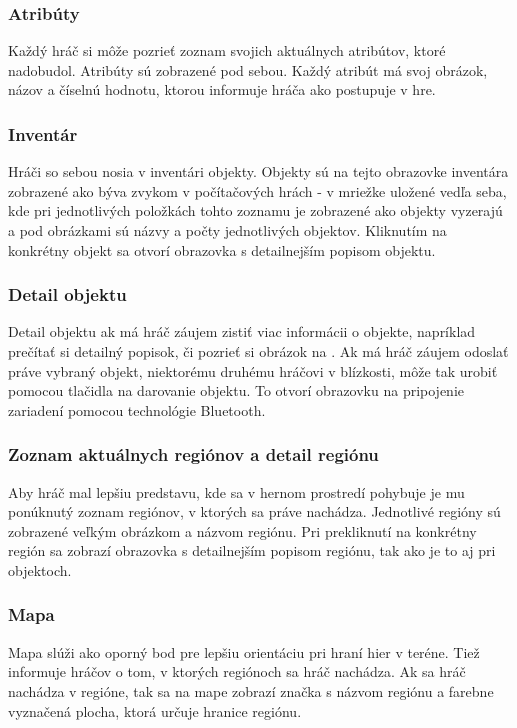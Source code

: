 \subsubsection{Atribúty}
Každý hráč si môže pozrieť zoznam svojich aktuálnych atribútov, ktoré nadobudol. Atribúty sú zobrazené pod sebou. Každý atribút má svoj obrázok, názov a číselnú hodnotu, ktorou informuje hráča ako postupuje v hre.

\subsubsection{Inventár}
Hráči so sebou nosia v inventári objekty. Objekty sú na tejto obrazovke inventára zobrazené ako býva zvykom v počítačových hrách - v mriežke uložené vedľa seba, kde pri jednotlivých položkách tohto zoznamu je zobrazené ako objekty vyzerajú a pod obrázkami sú názvy a počty jednotlivých objektov. Kliknutím na konkrétny objekt sa otvorí obrazovka s detailnejším popisom objektu.

\subsubsection{Detail objektu}
Detail objektu  ak má hráč záujem zistiť viac informácii o objekte, napríklad prečítať si detailný popisok, či pozrieť si obrázok na . Ak má hráč záujem odoslať práve vybraný objekt, niektorému druhému hráčovi v blízkosti, môže tak urobiť pomocou tlačidla na darovanie objektu. To otvorí obrazovku na pripojenie zariadení pomocou technológie Bluetooth.

\subsubsection{Zoznam aktuálnych regiónov a detail regiónu}
Aby hráč mal lepšiu predstavu, kde sa v hernom prostredí pohybuje je mu ponúknutý zoznam regiónov, v ktorých sa práve nachádza. Jednotlivé regióny sú zobrazené veľkým obrázkom a názvom regiónu. Pri prekliknutí na konkrétny región sa zobrazí obrazovka s detailnejším popisom regiónu, tak ako je to aj pri objektoch.

\subsubsection{Mapa}
Mapa slúži ako oporný bod  pre lepšiu orientáciu pri hraní hier v teréne. Tiež informuje hráčov o tom, v ktorých regiónoch sa hráč nachádza. Ak sa hráč nachádza v regióne, tak sa na mape zobrazí značka s názvom regiónu a farebne vyznačená plocha, ktorá určuje hranice regiónu.

